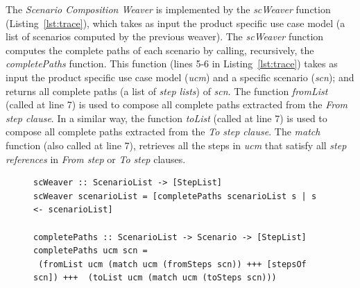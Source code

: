 \documentclass[11pt]{report}
\begin{document}


The \emph{Scenario Composition Weaver} is implemented by the \emph{scWeaver} function (Listing~\ref{lst:trace}), which takes 
as input the product specific use case model (a list of scenarios computed by the previous weaver).  
The \emph{scWeaver} function computes the complete paths of each  
scenario by calling, recursively, the \emph{completePaths} function. This 
function (lines 5-6 in Listing~\ref{lst:trace}) 
takes as input the product specific use case model (\emph{ucm}) and a specific
scenario (\emph{scn});
and returns all complete paths (a list of \emph{step lists}) of
\emph{scn}. The function \emph{fromList} (called at line 7) is used to
compose all complete paths extracted from the \emph{From step
clause}. In a similar way, the function \emph{toList} (called at
line 7) is used to compose all complete paths extracted from the
\emph{To step clause}. The \emph{match} function (also called at
line 7), retrieves all the steps in \emph{ucm} that satisfy all 
\emph{step references} in \emph{From step} or \emph{To step}
clauses. 


\begin{figure}
\begin{lstlisting}[belowskip=10pt,frame=tb,caption={Scenario composition weaver function},label=lst:trace]
scWeaver :: ScenarioList -> [StepList]
scWeaver scenarioList = [completePaths scenarioList s | s <- scenarioList]
 
completePaths :: ScenarioList -> Scenario -> [StepList]
completePaths ucm scn =
 (fromList ucm (match ucm (fromSteps scn)) +++ [stepsOf scn]) +++  (toList ucm (match ucm (toSteps scn)))

\end{lstlisting}
\end{figure}
\end{document}
